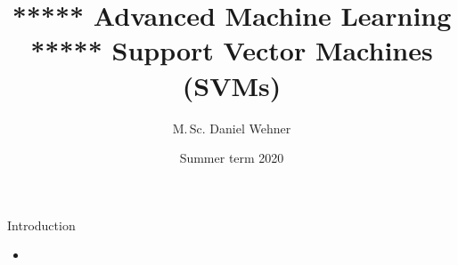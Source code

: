 




\title[Support Vector Machines (SVMs)]{***** Advanced Machine Learning ***** Support Vector Machines (SVMs)}
\author{M.\,Sc. Daniel Wehner}
\date{Summer term 2020}




\dwPrintTitle

\dwPrintToc


\begin{dwHeaderFrame}{Introduction}
	\begin{itemize}
		\item 
	\end{itemize}
\end{dwHeaderFrame}


\makethanks


